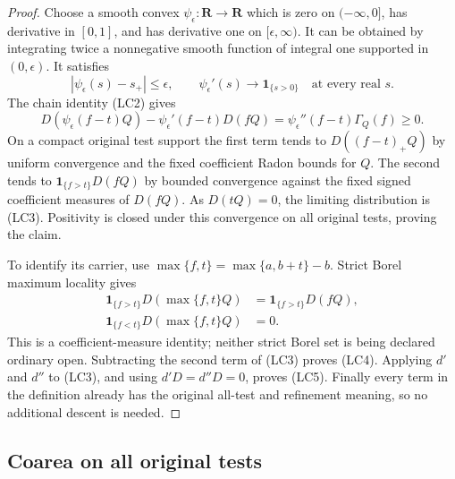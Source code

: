 \begin{proof}
Choose a smooth convex $\psi_\epsilon:\mathbf R\to\mathbf R$
which is zero on $(-\infty,0]$, has derivative in $[0,1]$, and
has derivative one on $[\epsilon,\infty)$.  It can be obtained by
integrating twice a nonnegative smooth function of integral one
supported in $(0,\epsilon)$.  It satisfies
\[
 |\psi_\epsilon(s)-s_+|\le\epsilon,
 \qquad
 \psi_\epsilon'(s)\longrightarrow\mathbf1_{\{s>0\}}
                   \quad\text{at every real }s.
\]
The chain identity (LC2) gives
\[
 D(\psi_\epsilon(f-t)Q)
        -\psi_\epsilon'(f-t)D(fQ)
            =\psi_\epsilon''(f-t)\Gamma_Q(f)\ge0.
 \tag{LC6}
\]
On a compact original test support the first term tends to
$D((f-t)_+Q)$ by uniform convergence and the fixed coefficient
Radon bounds for $Q$.  The second tends to
$\mathbf1_{\{f>t\}}D(fQ)$ by bounded convergence against the
fixed signed coefficient measures of $D(fQ)$.  As $D(tQ)=0$,
the limiting distribution is (LC3).  Positivity is closed under
this convergence on all original tests, proving the claim.

To identify its carrier, use $\max\{f,t\}=\max\{a,b+t\}-b$.
Strict Borel maximum locality gives
\[
 \begin{split}
 \mathbf1_{\{f>t\}}D(\max\{f,t\}Q)
        &=\mathbf1_{\{f>t\}}D(fQ),\\
 \mathbf1_{\{f<t\}}D(\max\{f,t\}Q)&=0.
 \end{split}
\]
This is a coefficient-measure identity; neither strict Borel set
is being declared ordinary open.  Subtracting the second term
of (LC3) proves (LC4).  Applying $d'$ and $d''$ to (LC3),
and using $d'D=d''D=0$, proves (LC5).  Finally every term in
the definition already has the original all-test and refinement
meaning, so no additional descent is needed.
\end{proof}

\subsection{Coarea on all original tests}

